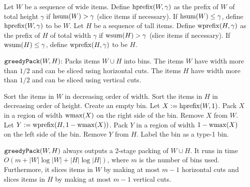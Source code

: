\begin{definition}
\label{defn:hw-prefix}
Let $W$ be a sequence of wide items.
Define $\operatorname{hprefix}(W, \gamma)$ as the prefix of $W$ of total height $\gamma$
if $\operatorname{hsum}(W) > \gamma$ (slice items if necessary).
If $\operatorname{hsum}(W) \le \gamma$, define $\operatorname{hprefix}(W, \gamma)$ to be $W$.
Let $H$ be a sequence of tall items.
Define $\operatorname{wprefix}(H, \gamma)$ as the prefix of $H$ of total width $\gamma$
if $\operatorname{wsum}(H) > \gamma$ (slice items if necessary).
If $\operatorname{wsum}(H) \le \gamma$, define $\operatorname{wprefix}(H, \gamma)$ to be $H$.
\end{definition}

\begin{algorithm}[!ht]
\caption{$\operatorname{\mathtt{greedyPack}}(W, H)$: Packs items $W \cup H$ into bins.
The items $W$ have width more than $1/2$ and can be sliced using horizontal cuts.
The items $H$ have width more than $1/2$ and can be sliced using vertical cuts.}
\label{algo:greedyPack}
\begin{algorithmic}[1]
\State Sort the items in $W$ in decreasing order of width.
\State Sort the items in $H$ in decreasing order of height.
    \State Create an empty bin.
        \State Let $X := \operatorname{hprefix}(W, 1)$. 
        \State Pack $X$ in a region of width $\operatorname{wmax}(X)$ on the right side of the bin.
        \State Remove $X$ from $W$.
        \State Let $Y := \operatorname{wprefix}(H, 1-\operatorname{wmax}(X))$. 
        \State Pack $Y$ in a region of width $1 - \operatorname{wmax}(X)$ on the left side of the bin.
        \State Remove $Y$ from $H$.
        \State Label the bin as a type-1 bin.
    \Else
    \EndIf
\EndWhile
\end{algorithmic}
\end{algorithm}

\begin{claim}
\label{thm:greedy-pack}
$\operatorname{\mathtt{greedyPack}}(W, H)$ always outputs a 2-stage packing of $W \cup H$.
It runs in time $O(m + |W|\log|W| + |H|\log|H|)$,
where $m$ is the number of bins used.
Furthermore, it slices items in $W$ by making at most $m-1$ horizontal cuts
and slices items in $H$ by making at most $m-1$ vertical cuts.
\end{claim}


